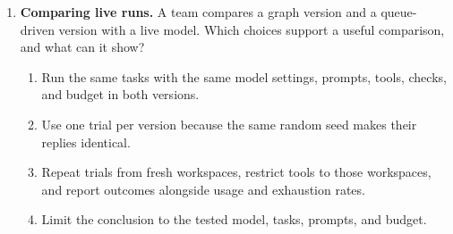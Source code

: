 \begin{enumerate}[start=51,itemsep=0.7\baselineskip]
\item\label{exercise:60} \begin{minipage}[t]{\linewidth}
\textbf{Comparing live runs.} A team compares a graph version and a queue-driven version with a live model. Which choices support a useful comparison, and what can it show?
\begin{enumerate}[label=\textnormal{(\Alph*)},leftmargin=*,itemsep=0pt]
\item Run the same tasks with the same model settings, prompts, tools, checks, and budget in both versions.
\item Use one trial per version because the same random seed makes their replies identical.
\item Repeat trials from fresh workspaces, restrict tools to those workspaces, and report outcomes alongside usage and exhaustion rates.
\item Limit the conclusion to the tested model, tasks, prompts, and budget.
\end{enumerate}
\end{minipage}

\end{enumerate}

